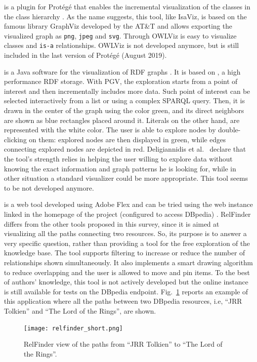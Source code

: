 \begin{description}[wide, labelindent=0pt]
\item[OWLViz] is a plugin for Prot\'eg\'e that enables the incremental visualization of the classes in the class hierarchy \cite{horridge2010owlviz}. As the name suggests, this tool, like IsaViz, is based on the famous library GraphViz developed by the AT\&T and allows exporting the visualized graph as \texttt{png}, \texttt{jpeg} and \texttt{svg}. Through OWLViz is easy to visualize classes and \texttt{is-a} relationships. OWLViz is not developed anymore, but is still included in the last version of Prot\'eg\'e (August 2019).

\item[Paged Graph Visualization (PGV)] is a Java software for the visualization of RDF graphs \cite{deligiannidis2007rdf}. It is based on \cite{janik2005brahms}, a high performance RDF storage. With PGV, the exploration starts from a point of interest and then incrementally includes more data. Such point of interest can be selected interactively from a list or using a complex SPARQL query. Then, it is drawn in the center of the graph using the color green, and its direct neighbors are shown as blue rectangles placed around it. Literals on the other hand, are represented with the white color. The user is able to explore nodes by double-clicking on them: explored nodes are then displayed in green, while edges connecting explored nodes are depicted in red. Deligiannidis et al.~\cite{deligiannidis2007rdf} declare that the tool's strength relies in helping the user willing to explore data without knowing the exact information and graph patterns he is looking for, while in other situation a standard visualizer could be more appropriate. This tool seems to be not developed anymore.

\item[RelFinder] is a web tool developed using Adobe Flex and can be tried using the web instance linked in the homepage of the project (configured to access DBpedia) \cite{heim2009}. RelFinder differs from the other tools proposed in this survey, since it is aimed at visualizing all the paths connecting two resources. So, its purpose is to answer a very specific question, rather than providing a tool for the free exploration of the knowledge base. The tool supports filtering to increase or reduce the number of relationships shown simultaneously. It also implements a smart drawing algorithm to reduce overlapping and the user is allowed to move and pin items. To the best of authors' knowledge, this tool is not actively developed but the online instance is still available for tests on the DBpedia endpoint. Fig.~\ref{fig:relfinder} reports an example of this application where all the paths between two DBpedia resources, i.e, ``JRR Tolkien'' and ``The Lord of the Rings'', are shown. 
\begin{figure}[!t]
    \centering
    \texttt{[image: relfinder\_short.png]}
    \caption{RelFinder view of the paths from ``JRR Tolkien'' to ``The Lord of the Rings''.}
    \label{fig:relfinder}
\end{figure}


\end{description}
